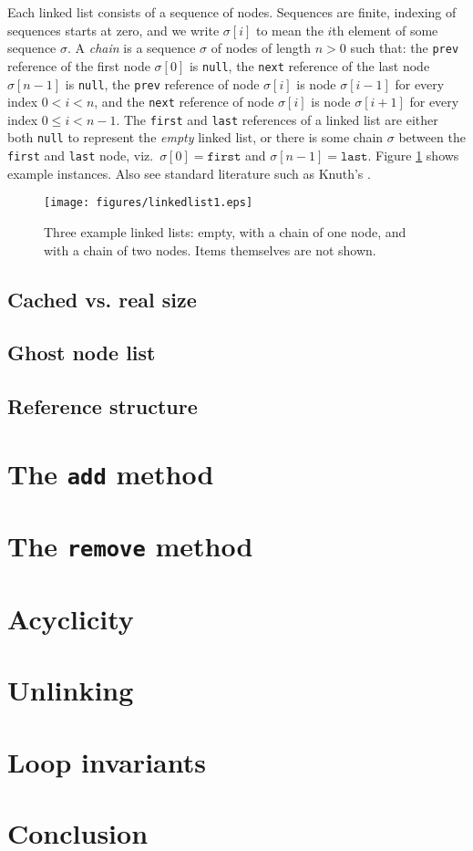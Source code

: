 \documentclass[runningheads]{llncs}
\begin{document}
Each linked list consists of a sequence of nodes. Sequences are finite, indexing of sequences starts at zero, and we write $\sigma[i]$ to mean the $i$th element of some sequence $\sigma$. A \emph{chain} is a sequence $\sigma$ of nodes of length $n>0$ such that: the \texttt{prev} reference of the first node $\sigma[0]$ is \texttt{null}, the \texttt{next} reference of the last node $\sigma[n-1]$ is \texttt{null}, the \texttt{prev} reference of node $\sigma[i]$ is node $\sigma[i-1]$ for every index $0<i<n$, and the \texttt{next} reference of node $\sigma[i]$ is node $\sigma[i+1]$ for every index $0\leq i < n-1$. The \texttt{first} and \texttt{last} references of a linked list are either both \texttt{null} to represent the \emph{empty} linked list, or there is some chain $\sigma$ between the \texttt{first} and \texttt{last} node, viz.~$\sigma[0]=\mathtt{first}$ and $\sigma[n-1]=\mathtt{last}$. Figure \ref{fig:linkedlist} shows example instances.
Also see standard literature such as Knuth's \cite[Section 2.2.5]{knuth1997art}.

\begin{figure}[t]
  \centering
  \texttt{[image: figures/linkedlist1.eps]}
  \caption{Three example linked lists: empty, with a chain of one node, and with a chain of two nodes. Items themselves are not shown.}
  \label{fig:linkedlist}
\end{figure}

\subsection{Cached vs. real size}
\subsection{Ghost node list}
\subsection{Reference structure}
\section{The \texttt{add} method}\label{sec:add}
\section{The \texttt{remove} method}\label{sec:remove}
\section{Acyclicity}\label{sec:acyclicity}
\section{Unlinking}\label{sec:unlinking}
\section{Loop invariants}\label{sec:loop-invariant}
\section{Conclusion}



\end{document}
